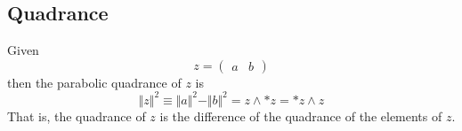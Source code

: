 \subsection{Quadrance}
Given
\begin{equation}
    z = \begin{pmatrix}
        a & b
    \end{pmatrix}
\end{equation}
then the parabolic quadrance of $z$ is
\begin{equation}
    \Vert z \Vert^{2} \equiv \Vert a \Vert^{2} - \Vert b \Vert^{2} = z \wedge {\ast z} = {\ast z} \wedge z
\end{equation}
That is, the quadrance of $z$ is the difference of the quadrance of the elements of $z$.